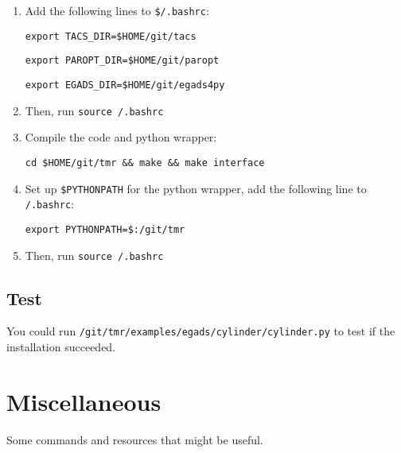 \documentclass{article}
\begin{document}
\begin{enumerate}

    \item Add the following lines to \texttt{\$\texttildelow/.bashrc}:

    \texttt{export TACS\string_DIR=\$HOME/git/tacs}

    \texttt{export PAROPT\string_DIR=\$HOME/git/paropt}

    \texttt{export EGADS\string_DIR=\$HOME/git/egads4py}

    \item Then, run \texttt{source \texttildelow/.bashrc}

    \item Compile the code and python wrapper:

    \texttt{cd \$HOME/git/tmr \&\& make \&\& make interface}

    \item Set up \texttt{\$PYTHONPATH} for the python wrapper,
    add the following line to \texttt{\texttildelow/.bashrc}:

    \texttt{export PYTHONPATH=\$:\texttildelow/git/tmr}

    \item Then, run \texttt{source \texttildelow/.bashrc}

\end{enumerate}

\subsection{Test}

You could run \texttt{\texttildelow/git/tmr/examples/egads/cylinder/cylinder.py} to test if the installation succeeded.

\section{Miscellaneous}

Some commands and resources that might be useful.
\end{document}
